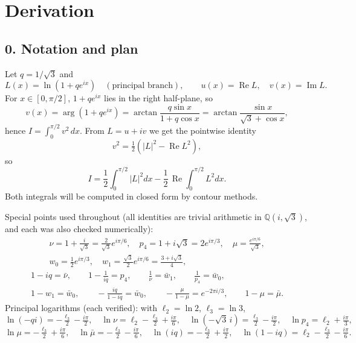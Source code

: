 \documentclass[11pt]{article}
\theoremstyle{remark}
\begin{document}
\section*{Derivation}

\subsection*{0. Notation and plan}

Let $q=1/\sqrt3$ and
\[
L(x)=\ln\!\left(1+qe^{ix}\right)\quad(\text{principal branch}),\qquad
u(x)=\operatorname{Re}L,\quad v(x)=\operatorname{Im}L .
\]
For $x\in[0,\pi/2]$, $1+qe^{ix}$ lies in the right half-plane, so
\[
v(x)=\arg\!\left(1+qe^{ix}\right)=\arctan\frac{q\sin x}{1+q\cos x}
=\arctan\frac{\sin x}{\sqrt3+\cos x},
\]
hence $I=\int_0^{\pi/2}v^2\,dx$. From $L=u+iv$ we get the pointwise identity
\[
v^2=\tfrac12\left(|L|^2-\operatorname{Re}L^2\right),
\]
so
\begin{equation*}
I=\frac12\int_0^{\pi/2}|L|^2dx-\frac12\,\operatorname{Re}\int_0^{\pi/2}L^2dx. \tag{0.1}
\end{equation*}
Both integrals will be computed in closed form by contour methods.

Special points used throughout (all identities are trivial arithmetic in $\mathbb Q(i,\sqrt3)$, and each was also checked numerically):
\[
\begin{gathered}
\nu=1+\tfrac{i}{\sqrt3}=\tfrac{2}{\sqrt3}e^{i\pi/6},\quad
p_4=1+i\sqrt3=2e^{i\pi/3},\quad
\mu=\tfrac{e^{i\pi/6}}{\sqrt3},\\
w_0=\tfrac12 e^{i\pi/3},\quad
w_1=\tfrac{\sqrt3}{2}e^{i\pi/6}=\tfrac{3+i\sqrt3}{4},
\end{gathered}
\]
\[
\begin{gathered}
1-iq=\bar\nu,\qquad 1-\tfrac{1}{iq}=p_4,\qquad
\tfrac1\nu=\bar w_1,\qquad \tfrac1{p_4}=\bar w_0,\\
1-w_1=\bar w_0,\qquad -\tfrac{iq}{1-iq}=\bar w_0,\qquad
-\tfrac{\mu}{1-\mu}=e^{-2\pi i/3},\qquad 1-\mu=\bar\mu .
\end{gathered}
\]
Principal logarithms (each verified): with $\ell_2=\ln2$, $\ell_3=\ln3$,
\[
\ln(-qi)=-\tfrac{\ell_3}2-\tfrac{i\pi}2,\quad
\ln\nu=\ell_2-\tfrac{\ell_3}2+\tfrac{i\pi}6,\quad
\ln(-\sqrt3\,i)=\tfrac{\ell_3}2-\tfrac{i\pi}2,\quad
\ln p_4=\ell_2+\tfrac{i\pi}3,
\]
\[
\ln\mu=-\tfrac{\ell_3}2+\tfrac{i\pi}6,\quad
\ln\bar\mu=-\tfrac{\ell_3}2-\tfrac{i\pi}6,\quad
\ln(iq)=-\tfrac{\ell_3}2+\tfrac{i\pi}2,\quad
\ln(1-iq)=\ell_2-\tfrac{\ell_3}2-\tfrac{i\pi}6 .
\]
\end{document}
